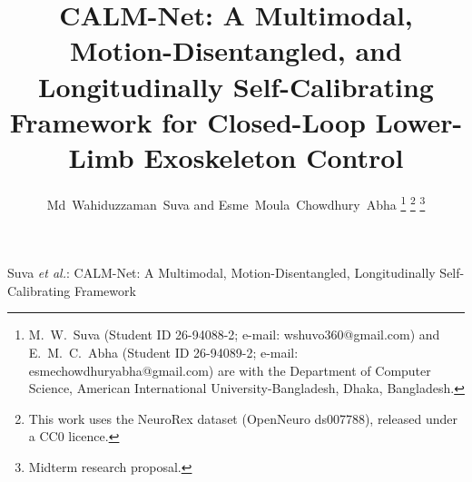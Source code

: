 \documentclass[journal]{IEEEtran}
\begin{document}
\title{CALM-Net: A Multimodal, Motion-Disentangled, and Longitudinally
Self-Calibrating Framework for Closed-Loop Lower-Limb Exoskeleton Control}

\author{Md~Wahiduzzaman~Suva and Esme~Moula~Chowdhury~Abha
\thanks{M.~W.~Suva (Student ID 26-94088-2; e-mail: \mbox{wshuvo360@gmail.com}) and
E.~M.~C.~Abha (Student ID 26-94089-2; e-mail: \mbox{esmechowdhuryabha@gmail.com}) are
with the Department of Computer Science, American International University-Bangladesh,
Dhaka, Bangladesh.}
\thanks{This work uses the NeuroRex dataset (OpenNeuro ds007788), released under
a CC0 licence.}
\thanks{Midterm research proposal.}}

%
{Suva \MakeLowercase{\textit{et al.}}: CALM-Net: A Multimodal, Motion-Disentangled, Longitudinally Self-Calibrating Framework}
\maketitle
\end{document}
